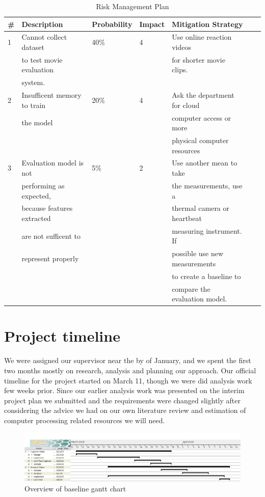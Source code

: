 \documentclass[12pt,a4paper,man]{report}
\begin{document}
\begin{table}[htbp]
\caption{\label{table:riskmgmt}
Risk Management Plan}
\centering
\begin{tabular}{|l|l|l|l|l|lp{3cm}|}
\hline
\textbf{\#} & \textbf{Description} & \textbf{Probability} & \textbf{Impact} & \textbf{Mitigation Strategy}\\
\hline
1 & Cannot collect dataset & 40\% & 4 & Use online reaction videos\\
 & to test movie evaluation &  &  & for shorter movie clips.\\
 & system. &  &  & \\
\hline
2 & Insufficent memory to train & 20\% & 4 & Ask the department for cloud\\
 & the model &  &  & computer access or more\\
 &  &  &  & physical computer resources\\
\hline
3 & Evaluation model is not & 5\% & 2 & Use another mean to take\\
 & performing as expected, &  &  & the measurements, use a\\
 & because features extracted &  &  & thermal camera or heartbeat\\
 & are not sufficent to &  &  & measuring instrument. If\\
 & represent properly &  &  & possible use new measurements\\
 &  &  &  & to create a baseline to\\
 &  &  &  & compare the evaluation model.\\
\hline
\end{tabular}
\end{table}

\chapter{Project timeline}
\label{sec:org7e9d564}
We were assigned our supervisor near the by of January, and we spent the first two months mostly on research, analysis and planning our approach.  Our official timeline for the project started on March 11, though we were did analysis work few weeks prior. Since our earlier analysis work was presented on the interim project plan we submitted and the requirements were changed slightly after considering the advice we had on our own literature review and estimation of computer processing related resources we will need.


\begin{figure}[htbp]
\centering
\includegraphics[width=7in]{./ext_img/gant1.png}
\caption{\label{fig:gantt1}
Overview of baseline gantt chart}
\end{figure}
\end{document}
